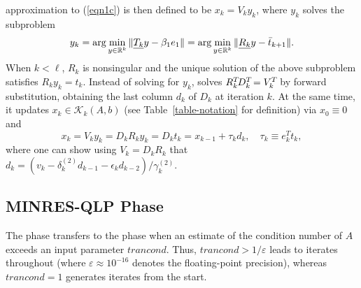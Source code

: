 \documentclass{doc_acmtrans2m}
\begin{document}
approximation to (\ref{eqn1c}) is then defined to be $x_k = V_k y_k$,
where $y_k$ solves the subproblem
\begin{equation}
  y_k = \arg\min_{ y \in \mathbb{R}^k }
        \norm{ \underline{T_k} y - \beta_1 e_1 }
        = \arg\min_{ y \in \mathbb{R}^k }
        \norm{ \underline{R_k} y - {\bar t}_{k+1} }.
  \label{eqn:LSsubprob}
\end{equation}
When $k < \ell$, $R_k$ is nonsingular and the unique solution of the
above subproblem satisfies $R_k y_k = t_k$.  Instead of solving for
$y_k$, \MINRES solves $R_k\T D_k\T = V_k\T$ by forward substitution,
obtaining the last column $d_k$ of $D_k$ at iteration $k$.  At the
same time, it updates $x_k \in \mathcal{K}_k(A,b)$ (see
Table~\ref{table-notation} for definition) via $x_0 \equiv 0$ and
\begin{equation}
    x_k = V_k y_k = D_k R_k y_k = D_k t_k
  = x_{k-1} + \tau_k d_k,\quad \tau_k\equiv e_k^Tt_k,
\label{minresxk}
\end{equation}
where one can show using $V_k = D_k R_k$ that
$  d_{k} = ({v_{k}-\delta_{k}^{(2)}d_{k-1} - \epsilon_{k}
   d_{k-2}}) / {\gamma_{k}^{(2)}}.  
$

\subsection{MINRES-QLP Phase}

The \MINRES phase transfers to the \MINRESQLP phase when an estimate
of the condition number of $A$ exceeds an input parameter
$\mathit{trancond}$.  Thus, $\mathit{trancond} > 1/\varepsilon$ leads
to \MINRES iterates throughout (where $\varepsilon \approx 10^{-16}$
denotes the floating-point precision), whereas $\mathit{trancond} = 1$
generates \MINRESQLP iterates from the start.
\end{document}
